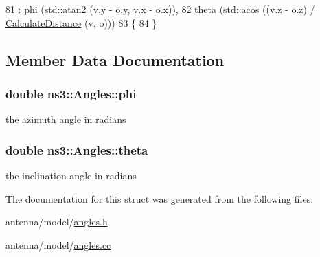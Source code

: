 \begin{DoxyCode}
81   : \hyperlink{structns3_1_1Angles_a0585b0de17bc6d358be18e14cf294ca8}{phi} (std::atan2 (v.y - o.y, v.x - o.x)),
82     \hyperlink{structns3_1_1Angles_a98c2a7d6c99f9fd8504e4801a68bf291}{theta} (std::acos ((v.z - o.z) / \hyperlink{namespacens3_aaae60adf695e280c4882ced6041d1628}{CalculateDistance} (v, o)))
83 \{
84 \}
\end{DoxyCode}


\subsection{Member Data Documentation}
\subsubsection[{\texorpdfstring{phi}{phi}}]{\setlength{\rightskip}{0pt plus 5cm}double ns3\+::\+Angles\+::phi}\hypertarget{structns3_1_1Angles_a0585b0de17bc6d358be18e14cf294ca8}{}\label{structns3_1_1Angles_a0585b0de17bc6d358be18e14cf294ca8}
the azimuth angle in radians 
\subsubsection[{\texorpdfstring{theta}{theta}}]{\setlength{\rightskip}{0pt plus 5cm}double ns3\+::\+Angles\+::theta}\hypertarget{structns3_1_1Angles_a98c2a7d6c99f9fd8504e4801a68bf291}{}\label{structns3_1_1Angles_a98c2a7d6c99f9fd8504e4801a68bf291}
the inclination angle in radians 

The documentation for this struct was generated from the following files\+:\begin{DoxyCompactItemize}
\item 
antenna/model/\hyperlink{angles_8h}{angles.\+h}\item 
antenna/model/\hyperlink{angles_8cc}{angles.\+cc}\end{DoxyCompactItemize}
